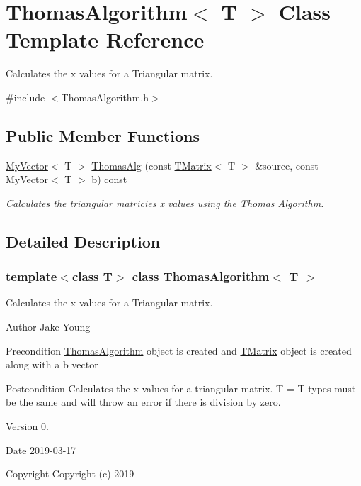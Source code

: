 \hypertarget{class_thomas_algorithm}{}\section{Thomas\+Algorithm$<$ T $>$ Class Template Reference}
\label{class_thomas_algorithm}


Calculates the x values for a Triangular matrix.  




{\ttfamily \#include $<$Thomas\+Algorithm.\+h$>$}

\subsection*{Public Member Functions}
\begin{DoxyCompactItemize}
\item 
\mbox{\hyperlink{class_my_vector}{My\+Vector}}$<$ T $>$ \mbox{\hyperlink{class_thomas_algorithm_a95ca444b7b9193ab8dafbfb5b0cea042}{Thomas\+Alg}} (const \mbox{\hyperlink{class_t_matrix}{T\+Matrix}}$<$ T $>$ \&source, const \mbox{\hyperlink{class_my_vector}{My\+Vector}}$<$ T $>$ b) const
\begin{DoxyCompactList}\small\item\em Calculates the triangular matricies x values using the Thomas Algorithm. \end{DoxyCompactList}\end{DoxyCompactItemize}


\subsection{Detailed Description}
\subsubsection*{template$<$class T$>$\newline
class Thomas\+Algorithm$<$ T $>$}

Calculates the x values for a Triangular matrix. 

\begin{DoxyAuthor}{Author}
Jake Young 
\end{DoxyAuthor}
\begin{DoxyPrecond}{Precondition}
\mbox{\hyperlink{class_thomas_algorithm}{Thomas\+Algorithm}} object is created and \mbox{\hyperlink{class_t_matrix}{T\+Matrix}} object is created along with a b vector 
\end{DoxyPrecond}
\begin{DoxyPostcond}{Postcondition}
Calculates the x values for a triangular matrix. T = T types must be the same and will throw an error if there is division by zero. 
\end{DoxyPostcond}
\begin{DoxyVersion}{Version}
0. 
\end{DoxyVersion}
\begin{DoxyDate}{Date}
2019-\/03-\/17
\end{DoxyDate}
\begin{DoxyCopyright}{Copyright}
Copyright (c) 2019 
\end{DoxyCopyright}


